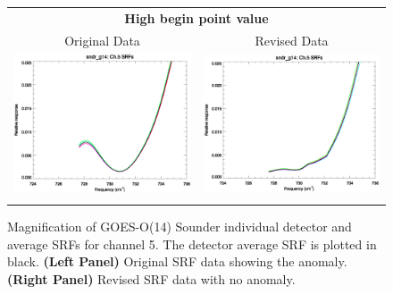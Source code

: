 \begin{figure}[htp]
  \centering
  \begin{tabular}{c c}
    \multicolumn{2}{c}{\textsf{\bfseries High begin point value}} \\
    \hspace{2.0em}\textsf{Original Data} &
    \hspace{2.0em}\textsf{Revised Data} \\
    \includegraphics[scale=0.5,trim=0 40 0 0]{graphics/zoom_anomaly/original/sndr_g14.ch5.srf.eps} &
    \includegraphics[scale=0.5,trim=0 40 0 0]{graphics/zoom_anomaly/revised/sndr_g14.ch5.srf.eps} \\\\
  \end{tabular}
  \caption{Magnification of GOES-O(14) Sounder individual detector and average SRFs for channel 5. The detector average SRF is plotted in black. \textbf{(Left Panel)} Original SRF data showing the anomaly. \textbf{(Right Panel)} Revised SRF data with no anomaly.}
  \label{fig:sndr_g14.ch5.anomaly}
\end{figure}

